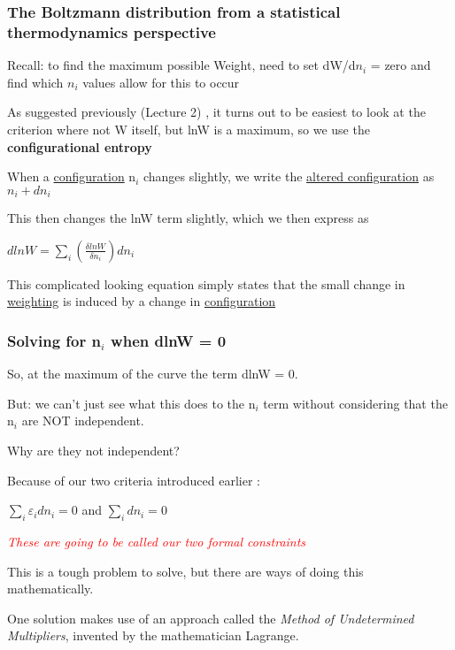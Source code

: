 \documentclass[ignorenonframetext]{beamer}
\begin{document}
\begin{frame}[allowframebreaks]
\frametitle{The Boltzmann distribution from a statistical thermodynamics perspective}
Recall: to find the maximum possible Weight, need to set dW/d\(n_i\) = zero and find which \(n_i\) values allow for this to occur\smallskip

As suggested previously (Lecture 2) , it turns out to be easiest to look at the criterion where not W itself, but lnW is a maximum, so we use the \textbf{configurational entropy}\smallskip

When a \underline{configuration} n\(_i\) changes slightly, we write the \underline{altered configuration} as \(n_i + dn_i\)\smallskip
 
This then changes the lnW term slightly, which we then express as 
\begin{center}
\(dlnW  = \sum_i \left( \frac{\delta lnW}{\delta n_i}\right)  dn_i\) \hspace{1in} 
\end{center}

This complicated looking equation simply states that the small change in \underline{weighting} is induced by a change in \underline{configuration}
\end{frame}

\begin{frame}[allowframebreaks]
\frametitle{Solving for n\(_i\) when dlnW = 0}
So, at the maximum of the curve the term dlnW  = 0.

But: we can't just see what this does to the n\(_i\) term without considering that the n\(_i\) are NOT independent. 
 
Why are they not independent?
 
Because of our two criteria introduced earlier :

\medskip
\(\sum_i \varepsilon_i  dn_i  =    0            	\)\newline\smallskip
and\newline\smallskip
\(\sum_i dn_i  =    0            	\)\newline

\textit{\textcolor{red}{These are going to be called our two formal constraints}}
 
This is a tough problem to solve, but there are ways of doing this mathematically. 
 
One solution makes use of an approach called the \textit{Method of Undetermined Multipliers}, invented by the mathematician Lagrange.
\end{frame}
\end{document}
